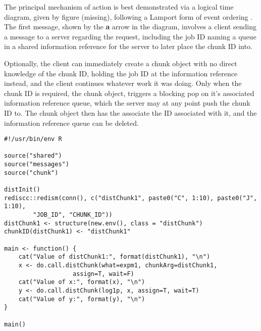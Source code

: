 The principal mechanism of action is best demonstrated via a logical
time diagram, given by figure (missing), following a Lamport form of
event ordering \cite{lamport1978ordering}. The first message, shown by
the \textbf{a} arrow in the diagram, involves a client sending a message
to a server regarding the request, including the job ID naming a queue
in a shared information reference for the server to later place the
chunk ID into.

Optionally, the client can immediately create a chunk object with no
direct knowledge of the chunk ID, holding the job ID at the information
reference instead, and the client continues whatever work it was doing.
Only when the chunk ID is required, the chunk object, triggers a
blocking pop on it's associated information reference queue, which the
server may at any point push the chunk ID to. The chunk object then has
the associate the ID associated with it, and the information reference
queue can be deleted.

\hypertarget{lst:wo-ass-client}{%
\label{lst:wo-ass-client}}%
\begin{verbatim}
#!/usr/bin/env R

source("shared")
source("messages")
source("chunk")

distInit()
rediscc::redism(conn(), c("distChunk1", paste0("C", 1:10), paste0("J", 1:10),
        "JOB_ID", "CHUNK_ID"))
distChunk1 <- structure(new.env(), class = "distChunk")
chunkID(distChunk1) <- "distChunk1"

main <- function() {
    cat("Value of distChunk1:", format(distChunk1), "\n")
    x <- do.call.distChunk(what=expm1, chunkArg=distChunk1,
                   assign=T, wait=F)
    cat("Value of x:", format(x), "\n")
    y <- do.call.distChunk(log1p, x, assign=T, wait=T)
    cat("Value of y:", format(y), "\n")
}

main()
\end{verbatim}

